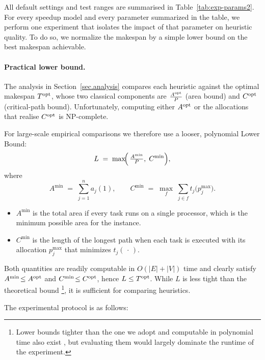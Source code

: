 \documentclass{article}
\newcommand\opt{\textnormal{opt}\xspace}
\begin{document}
All default settings and test ranges are summarised in
Table~\ref{tab:exp-params2}.
For every speedup model and every parameter summarized in the table, we perform one experiment that isolates the impact
of that parameter on heuristic quality. To do so, we normalize the makespan by a simple lower bound on the best makespan achievable.

\paragraph{Practical lower bound.}
The analysis in Section~\ref{sec.analysis} compares each heuristic against the
optimal makespan \(T^{\opt}\), whose two classical components are
\(\tfrac{A^{\opt}}{P}\) (area bound) and \(C^{\opt}\) (critical-path bound).
Unfortunately, computing either \(A^{\opt}\) or the allocations that realise
\(C^{\opt}\) is NP-complete.%

For large-scale empirical comparisons we therefore use a
looser, polynomial Lower Bound:
\[
L \;=\;
\max\!\Bigl(\,
  \tfrac{A^{\min}}{P},\;
  C^{\min}
\Bigr),
\]
where
\[
A^{\min} \;=\;
\sum_{j=1}^{n} a_j(1),  \qquad
C^{\min} \;=\;
\max_{f}\;
\sum_{j\in f}\!
      t_j\!\bigl(p_j^{\max}\bigr).
\]
\begin{itemize}
  \item \(A^{\min}\) is the total area if every task runs on a single
        processor, which is the minimum possible area for the instance.
  \item \(C^{\min}\) is the length of the longest path when each task is
        executed with its allocation \(p_j^{\max}\) that minimizes
        \(t_j(\,\cdot\,)\).
\end{itemize}
Both quantities are readily computable in \(O(|E|+|V|)\) time and clearly
satisfy \(A^{\min}\!\le A^{\opt}\) and \(C^{\min}\!\le C^{\opt}\), hence
\(L\le T^{\opt}\).  While \(L\) is less tight than the theoretical bound \footnote{%
  Lower bounds tighter than the one we adopt and computable in polynomial time also exist
  \cite{Lepere01_DAG}, but evaluating them would largely dominate the runtime of the experiment.}, it
is sufficient for comparing heuristics.

The experimental protocol is as follows:
\end{document}
